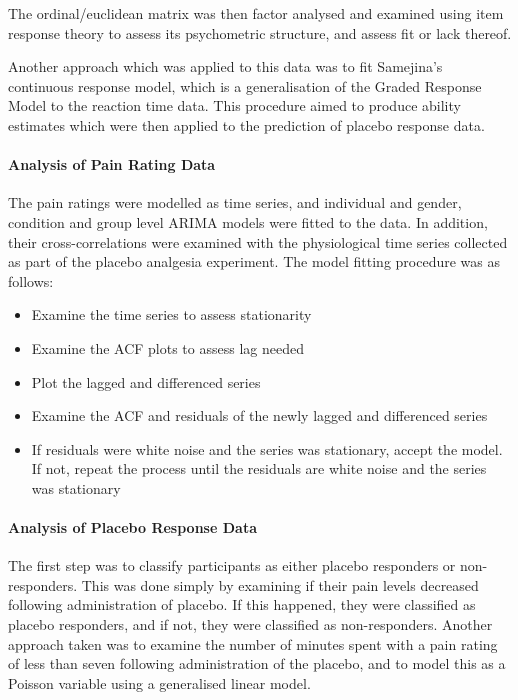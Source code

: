 The ordinal/euclidean matrix was then factor analysed and examined using item response theory to assess its psychometric structure, and assess fit or lack thereof.

Another approach which was applied to this data was to fit Samejina's continuous response model, which is a generalisation of the Graded Response Model %
to the reaction time data. This procedure aimed to produce ability estimates which were then applied to the prediction of placebo response data. 

\paragraph{Analysis of Pain Rating Data}
\label{sec:analysis-pain-rating}

The pain ratings were modelled as time series, and individual and gender, condition and group level ARIMA models were fitted to the data. In addition, their cross-correlations were examined with the physiological time series collected as part of the placebo analgesia experiment. The model fitting procedure was as follows:
\begin{itemize}
\item Examine the time series to assess stationarity

\item Examine the ACF plots to assess lag needed

\item Plot the lagged and differenced series


\item Examine the ACF and residuals of the newly lagged and differenced series

\item If residuals were white noise and the series was stationary, accept the model. If not, repeat the process until the residuals are white noise and the series was  stationary
\end{itemize}

\paragraph{Analysis of Placebo Response Data}
\label{sec:analys-plac-resp}

The first step was to classify participants as either placebo responders or non-responders. This was done simply by examining if their pain levels decreased following administration of placebo. If this happened, they were classified as placebo responders, and if not, they were classified as non-responders. Another approach taken was to examine the number of minutes spent with a pain rating of less than seven following administration of the placebo, and to model this as a Poisson variable using a generalised linear model. 

